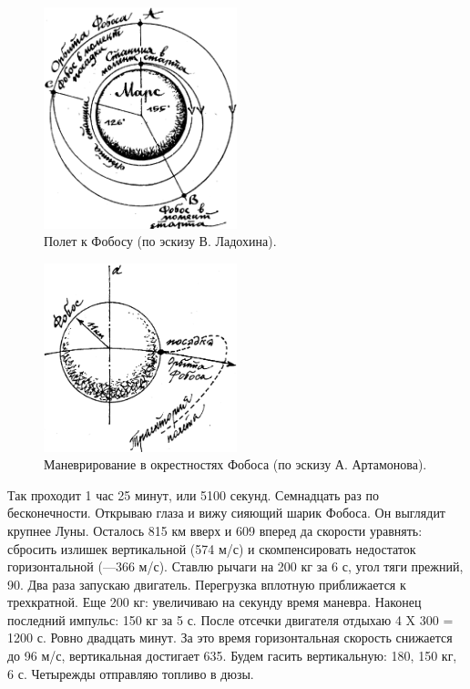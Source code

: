 \documentclass[11pt,a4paper,oneside]{article}
\begin{document}
\begin{figure}[H]
\includegraphics[width=0.5\textwidth]{fobos1}
\caption{Полет к Фобосу (по эскизу В. Ладохина).}
\end{figure}

\begin{figure}[H]
\includegraphics[width=0.5\textwidth]{fobos2}
\caption{Маневрирование в окрестностях Фобоса (по эскизу А. Артамонова).}
\end{figure}

Так проходит 1 час 25 минут, или 5100 секунд. Семнадцать раз по бесконечности. Открываю глаза и вижу сияющий шарик Фобоса. Он выглядит крупнее Луны. Осталось 815 км вверх и 609 вперед да скорости уравнять: сбросить излишек вертикальной (574 м/с) и скомпенсировать недостаток горизонтальной (—366 м/с). Ставлю рычаги на 200 кг за 6 с, угол тяги прежний, 90\degree. Два раза запускаю двигатель. Перегрузка вплотную приближается к трехкратной. Еще 200 кг: увеличиваю на секунду время маневра. Наконец последний импульс: 150 кг за 5 с. После отсечки двигателя отдыхаю 4 X 300 = 1200 с. Ровно двадцать минут. За это время горизонтальная скорость снижается до 96 м/с, вертикальная достигает 635. Будем гасить вертикальную: 180\degree, 150 кг, 6 с. Четырежды отправляю топливо в дюзы.
\end{document}
